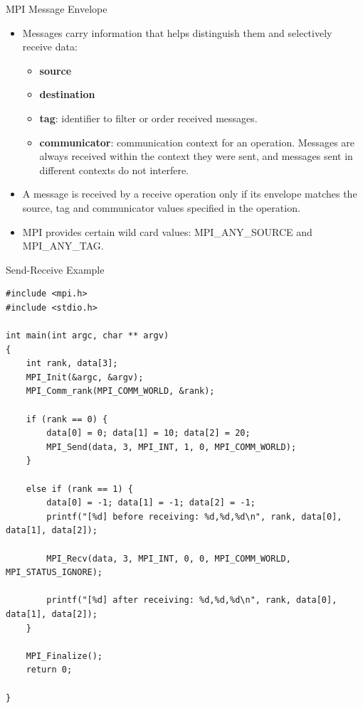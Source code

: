 \begin{frame}[fragile]{MPI Message Envelope}
\vspace{5mm}
    \begin{itemize}
        \item Messages carry information that helps distinguish them and selectively receive data:
            \begin{itemize}
            \item \textbf{source}
            \vspace{1mm}
            \item \textbf{destination} 
            \vspace{1mm}
            \item \textbf{tag}: identifier to filter or order received messages.  
            \vspace{1mm}
            \item \textbf{communicator}: communication context for an operation. Messages are always received within the context they were sent, and messages sent in different contexts
                    do not interfere.
            \end{itemize}
        \item A message is received by a receive operation only if its envelope matches the source, tag and communicator values specified in the operation. 
        \item MPI provides certain wild card values: MPI\_ANY\_SOURCE and MPI\_ANY\_TAG.
    \end{itemize}
\end{frame}

\begin{frame}[fragile]{Send-Receive Example}

\tiny\begin{verbatim}
#include <mpi.h>
#include <stdio.h>

int main(int argc, char ** argv)
{
    int rank, data[3];
    MPI_Init(&argc, &argv);
    MPI_Comm_rank(MPI_COMM_WORLD, &rank);
    
    if (rank == 0) {
        data[0] = 0; data[1] = 10; data[2] = 20;
        MPI_Send(data, 3, MPI_INT, 1, 0, MPI_COMM_WORLD);
    }
    
    else if (rank == 1) {
        data[0] = -1; data[1] = -1; data[2] = -1;
        printf("[%d] before receiving: %d,%d,%d\n", rank, data[0], data[1], data[2]);
        
        MPI_Recv(data, 3, MPI_INT, 0, 0, MPI_COMM_WORLD, MPI_STATUS_IGNORE);
        
        printf("[%d] after receiving: %d,%d,%d\n", rank, data[0], data[1], data[2]);
    }
    
    MPI_Finalize();
    return 0;
    
}
\end{verbatim}
\normalsize
\end{frame}

